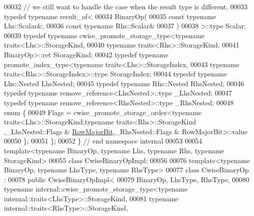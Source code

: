\begin{DoxyCode}
00032   \textcolor{comment}{// we still want to handle the case when the result type is different.}
00033   \textcolor{keyword}{typedef} \textcolor{keyword}{typename} result\_of<
00034                      BinaryOp(
00035                        \textcolor{keyword}{const} \textcolor{keyword}{typename} Lhs::Scalar&,
00036                        \textcolor{keyword}{const} \textcolor{keyword}{typename} Rhs::Scalar&
00037                      )
00038                    >::type Scalar;
00039   \textcolor{keyword}{typedef} \textcolor{keyword}{typename} cwise\_promote\_storage\_type<typename traits<Lhs>::StorageKind,
00040                                               \textcolor{keyword}{typename} traits<Rhs>::StorageKind,
00041                                               BinaryOp>::ret StorageKind;
00042   \textcolor{keyword}{typedef} \textcolor{keyword}{typename} promote\_index\_type<typename traits<Lhs>::StorageIndex,
00043                                       \textcolor{keyword}{typename} traits<Rhs>::StorageIndex>::type StorageIndex;
00044   \textcolor{keyword}{typedef} \textcolor{keyword}{typename} Lhs::Nested LhsNested;
00045   \textcolor{keyword}{typedef} \textcolor{keyword}{typename} Rhs::Nested RhsNested;
00046   \textcolor{keyword}{typedef} \textcolor{keyword}{typename} remove\_reference<LhsNested>::type \_LhsNested;
00047   \textcolor{keyword}{typedef} \textcolor{keyword}{typename} remove\_reference<RhsNested>::type \_RhsNested;
00048   \textcolor{keyword}{enum} \{
00049     Flags = cwise\_promote\_storage\_order<typename traits<Lhs>::StorageKind,\textcolor{keyword}{typename} traits<Rhs>::StorageKind
      ,\_LhsNested::Flags & \hyperlink{group__flags_gae4f56c2a60bbe4bd2e44c5b19cbe8762}{RowMajorBit},\_RhsNested::Flags & RowMajorBit>::value
00050   \};
00051 \};
00052 \} \textcolor{comment}{// end namespace internal}
00053 
00054 \textcolor{keyword}{template}<\textcolor{keyword}{typename} BinaryOp, \textcolor{keyword}{typename} Lhs, \textcolor{keyword}{typename} Rhs, \textcolor{keyword}{typename} StorageKind>
00055 \textcolor{keyword}{class }CwiseBinaryOpImpl;
00056 
00076 \textcolor{keyword}{template}<\textcolor{keyword}{typename} BinaryOp, \textcolor{keyword}{typename} LhsType, \textcolor{keyword}{typename} RhsType>
00077 \textcolor{keyword}{class }CwiseBinaryOp : 
00078   \textcolor{keyword}{public} CwiseBinaryOpImpl<
00079           BinaryOp, LhsType, RhsType,
00080           typename internal::cwise\_promote\_storage\_type<typename internal::traits<LhsType>::StorageKind,
00081                                                         typename internal::traits<RhsType>::StorageKind,

\end{DoxyCode}

